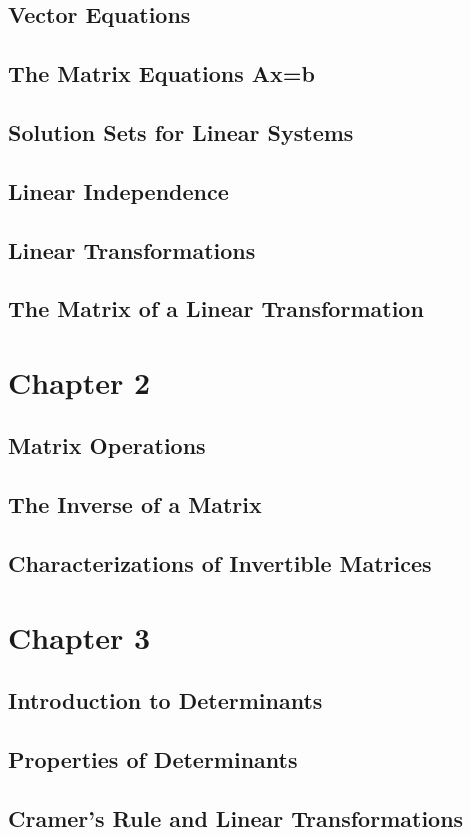 \documentclass{article}
\begin{document}
\subsection{Vector Equations}
\subsection{The Matrix Equations Ax=b}
\subsection{Solution Sets for Linear Systems}
\subsection{Linear Independence}
\subsection{Linear Transformations}
\subsection{The Matrix of a Linear Transformation}
\section{Chapter 2}
\subsection{Matrix Operations}
\subsection{The Inverse of a Matrix}
\subsection{Characterizations of Invertible Matrices}
\section{Chapter 3}
\subsection{Introduction to Determinants}
\subsection{Properties of Determinants}
\subsection{Cramer's Rule and Linear Transformations}
\end{document}
